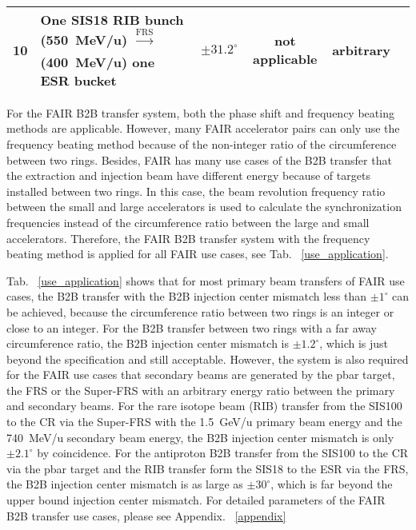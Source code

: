 \begin{table*}
\begin{center}
\begin{tabular}{| c | p{4cm}| p{2cm} | c | c |p{7cm} |}
10&One SIS18 RIB bunch (\SI{550}{MeV/u}) $\xrightarrow[\text{}]{\text{FRS}}$ (\SI{400}{MeV/u}) one ESR bucket &$\pm31.2^\circ$	& not applicable & arbitrary&		\\ \hline

    \end{tabular}
\end{center}
\end{table*}

For the FAIR B2B transfer system, both the phase shift and frequency beating methods are applicable. However, many FAIR accelerator pairs can only use the frequency beating method because of the non-integer ratio of the circumference between two rings. Besides, FAIR has many use cases of the B2B transfer that the extraction and injection beam have different energy because of targets installed between two rings. In this case, the beam revolution frequency ratio between the small and large accelerators is used to calculate the synchronization frequencies instead of the circumference ratio between the large and small accelerators. Therefore, the FAIR B2B transfer system with the frequency beating method is applied for all FAIR use cases, see Tab. ~\ref{use_application}.

Tab. ~\ref{use_application} shows that for most primary beam transfers of FAIR use cases, the B2B transfer with the B2B injection center mismatch less than $\pm1^\circ$ can be achieved, because the circumference ratio between two rings is an integer or close to an integer. For the B2B transfer between two rings with a far away circumference ratio, the B2B injection center mismatch is $\pm1.2^\circ$, which is just beyond the specification and still acceptable. However, the system is also required for the FAIR use cases that secondary beams are generated by the pbar target, the FRS or the Super-FRS with an arbitrary energy ratio between the primary and secondary beams. For the rare isotope beam (RIB) transfer from the SIS100 to the CR via the Super-FRS with the \SI{1.5}{GeV/u} primary beam energy and the \SI{740}{MeV/u} secondary beam energy, the B2B injection center mismatch is only $\pm2.1^\circ$ by coincidence. For the antiproton B2B transfer from the SIS100 to the CR via the pbar target and the RIB transfer form the SIS18 to the ESR via the FRS, the B2B injection center mismatch is as large as $\pm30^\circ$, which is far beyond the upper bound injection center mismatch. For detailed parameters of the FAIR B2B transfer use cases, please see Appendix. ~\ref{appendix}



